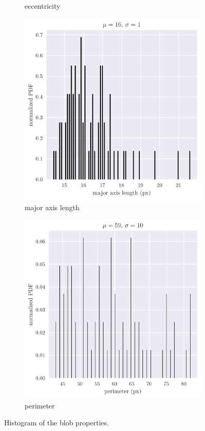 \documentclass[12pt,a4paper]{article}
\begin{document}
\begin{figure}[htb]
\begin{subfigure}[h!]{0.49\textwidth}
		\caption{eccentricity}
		\label{fig:blob-ecc}
	\end{subfigure}
	\begin{subfigure}[h!]{0.49\textwidth}
		\includegraphics[width=\textwidth]{majax_hist.png}
		\caption{major axis length}
		\label{fig:blob-majax}
	\end{subfigure}
	\begin{subfigure}[h!]{0.49\textwidth}
		\includegraphics[width=\textwidth]{per_hist.png}
		\caption{perimeter}
		\label{fig:blob-per}
	\end{subfigure}
	\caption{Histogram of the blob properties.}
	\label{fig:blob-props}
\end{figure}
\end{document}
